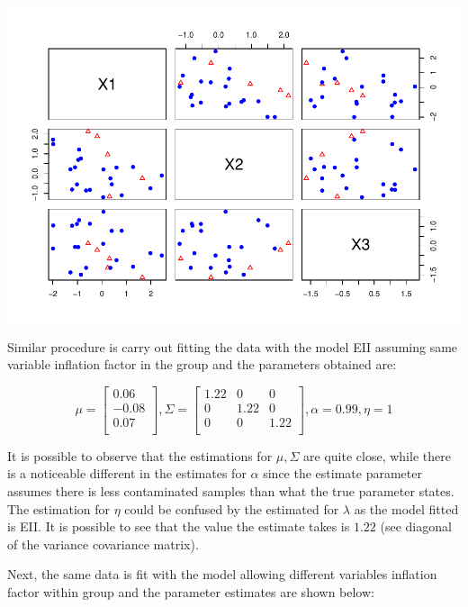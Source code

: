 \documentclass[
]{article}
\begin{document}
\includegraphics{DifferentVarInflationFactors_files/figure-latex/plotB_test-1.pdf}

Similar procedure is carry out fitting the data with the model EII
assuming same variable inflation factor in the group and the parameters
obtained are:

\[
\mu = \begin{bmatrix}0.06 \\-0.08 \\0.07 \\\end{bmatrix} , \Sigma = \begin{bmatrix}1.22&0&0 \\0&1.22&0 \\0&0&1.22 \\\end{bmatrix}, \alpha = 0.99 , \eta = 1
\]

It is possible to observe that the estimations for \(\mu,\Sigma\) are
quite close, while there is a noticeable different in the estimates for
\(\alpha\) since the estimate parameter assumes there is less
contaminated samples than what the true parameter states. The estimation
for \(\eta\) could be confused by the estimated for \(\lambda\) as the
model fitted is EII. It is possible to see that the value the estimate
takes is \(1.22\) (see diagonal of the variance covariance matrix).

Next, the same data is fit with the model allowing different variables
inflation factor within group and the parameter estimates are shown
below:
\end{document}
